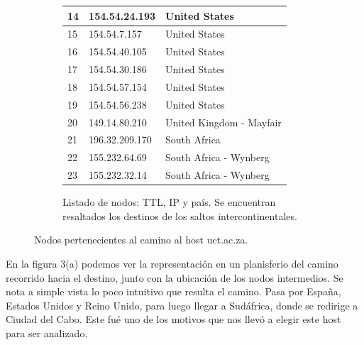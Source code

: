 \begin{figure}[ht]
\begin{subfigure}[b]{.39\textwidth}
\begin{tabular}{ l l l }
      14 & 154.54.24.193 & United States\\ \hline
      15 & 154.54.7.157 & United States\\ \hline
      16 & 154.54.40.105 & United States\\ \hline
      \rowcolor[RGB]{196,214,255}
      17 & 154.54.30.186 & United States\\ \hline
      18 & 154.54.57.154 & United States\\ \hline
      19 & 154.54.56.238 & United States\\ \hline
      20 & 149.14.80.210 & United Kingdom - Mayfair\\ \hline
      \rowcolor[RGB]{196,214,255}
      21 & 196.32.209.170 & South Africa\\ \hline
      22 & 155.232.64.69 & South Africa - Wynberg\\ \hline
      23 & 155.232.32.14 & South Africa - Wynberg\\ \hline
      \hline
    \end{tabular}
    \label{fig:capetown_list}
    \caption{Listado de nodos: TTL, IP y país. Se encuentran resaltados los destinos de los saltos intercontinentales.}
  \end{subfigure}
  \caption{Nodos pertenecientes al camino al host uct.ac.za.}
\end{figure}

\par En la figura 3(a) podemos ver la representación en un planisferio del camino recorrido hacia el destino, junto con la ubicación de los nodos intermedios. Se nota a simple vista lo poco intuitivo que resulta el camino. Pasa por España, Estados Unidos y Reino Unido, para luego llegar a Sudáfrica, donde se redirige a Ciudad del Cabo. Este fué uno de los motivos que nos llevó a elegir este host para ser analizado.

